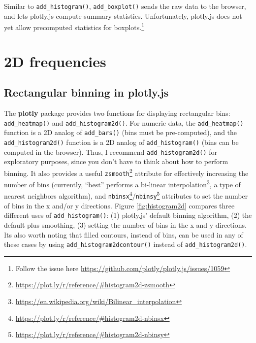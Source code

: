 \documentclass[
  12pt,
]{krantz}
\renewcommand{\href}[2]{#2\footnote{\url{#1}}}
\begin{document}
Similar to \texttt{add\_histogram()}, \texttt{add\_boxplot()} sends the raw data to the browser, and lets plotly.js compute summary statistics. Unfortunately, plotly.js does not yet allow precomputed statistics for boxplots.\footnote{Follow the issue here \url{https://github.com/plotly/plotly.js/issues/1059}}

\hypertarget{frequencies-2D}{%
\chapter{2D frequencies}\label{frequencies-2D}}

\hypertarget{rectangular-binning-in-plotly.js}{%
\section{Rectangular binning in plotly.js}\label{rectangular-binning-in-plotly.js}}


The \textbf{plotly} package provides two functions for displaying rectangular bins: \texttt{add\_heatmap()} and \texttt{add\_histogram2d()}. For numeric data, the \texttt{add\_heatmap()} function is a 2D analog of \texttt{add\_bars()} (bins must be pre-computed), and the \texttt{add\_histogram2d()} function is a 2D analog of \texttt{add\_histogram()} (bins can be computed in the browser). Thus, I recommend \texttt{add\_histogram2d()} for exploratory purposes, since you don't have to think about how to perform binning. It also provides a useful \href{https://plot.ly/r/reference/\#histogram2d-zsmooth}{\texttt{zsmooth}} attribute for effectively increasing the number of bins (currently, ``best'' performs a \href{https://en.wikipedia.org/wiki/Bilinear_interpolation}{bi-linear interpolation}, a type of nearest neighbors algorithm), and \href{https://plot.ly/r/reference/\#histogram2d-nbinsx}{\texttt{nbinsx}}/\href{https://plot.ly/r/reference/\#histogram2d-nbinsy}{\texttt{nbinsy}} attributes to set the number of bins in the x and/or y directions. Figure \ref{fig:histogram2d} compares three different uses of \texttt{add\_histogram()}: (1) plotly.js' default binning algorithm, (2) the default plus smoothing, (3) setting the number of bins in the x and y directions. Its also worth noting that filled contours, instead of bins, can be used in any of these cases by using \texttt{add\_histogram2dcontour()} instead of \texttt{add\_histogram2d()}.
\end{document}
